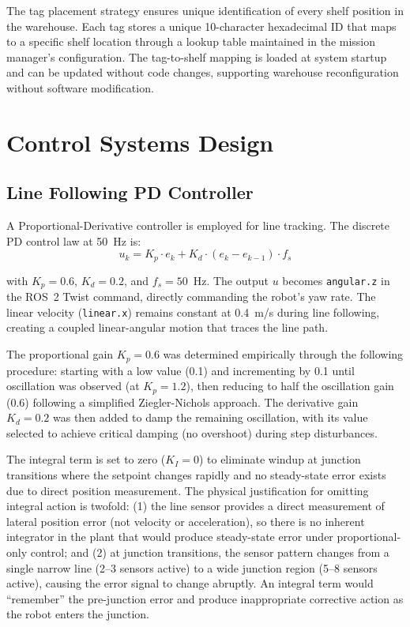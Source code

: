 \documentclass[12pt,a4paper,oneside]{report}
\begin{document}
The tag placement strategy ensures unique identification of every shelf position in the warehouse. Each tag stores a unique 10-character hexadecimal ID that maps to a specific shelf location through a lookup table maintained in the mission manager's configuration. The tag-to-shelf mapping is loaded at system startup and can be updated without code changes, supporting warehouse reconfiguration without software modification.

\section{Control Systems Design}

\subsection{Line Following PD Controller}

A Proportional-Derivative controller is employed for line tracking. The discrete PD control law at 50~Hz is:
\begin{equation}
u_k = K_p \cdot e_k + K_d \cdot (e_k - e_{k-1}) \cdot f_s
\label{eq:pd_law}
\end{equation}

with $K_p = 0.6$, $K_d = 0.2$, and $f_s = 50$~Hz. The output $u$ becomes \texttt{angular.z} in the ROS~2 Twist command, directly commanding the robot's yaw rate. The linear velocity (\texttt{linear.x}) remains constant at 0.4~m/s during line following, creating a coupled linear-angular motion that traces the line path.

The proportional gain $K_p = 0.6$ was determined empirically through the following procedure: starting with a low value (0.1) and incrementing by 0.1 until oscillation was observed (at $K_p = 1.2$), then reducing to half the oscillation gain (0.6) following a simplified Ziegler-Nichols approach. The derivative gain $K_d = 0.2$ was then added to damp the remaining oscillation, with its value selected to achieve critical damping (no overshoot) during step disturbances.

The integral term is set to zero ($K_I = 0$) to eliminate windup at junction transitions where the setpoint changes rapidly and no steady-state error exists due to direct position measurement. The physical justification for omitting integral action is twofold: (1) the line sensor provides a direct measurement of lateral position error (not velocity or acceleration), so there is no inherent integrator in the plant that would produce steady-state error under proportional-only control; and (2) at junction transitions, the sensor pattern changes from a single narrow line (2--3 sensors active) to a wide junction region (5--8 sensors active), causing the error signal to change abruptly. An integral term would ``remember'' the pre-junction error and produce inappropriate corrective action as the robot enters the junction.
\end{document}
